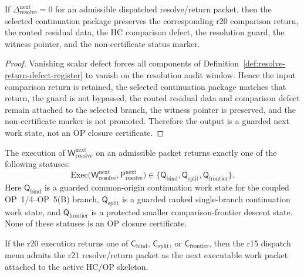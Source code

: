 \begin{lemma}
\label{lem:zero-resolve-return-defect-preserves-selected-continuation-data}
If \(\Delta_{\mathrm{resolve}}^{\mathrm{next}}=0\) for an admissible dispatched resolve/return packet, then the selected continuation package preserves the corresponding r20 comparison return, the routed residual data, the HC comparison defect, the resolution guard, the witness pointer, and the non-certificate status marker.
\end{lemma}

\begin{proof}
Vanishing scalar defect forces all components of Definition~\ref{def:resolve-return-defect-register} to vanish on the resolution audit window.  Hence the input comparison return is retained, the selected continuation package matches that return, the guard is not bypassed, the routed residual data and comparison defect remain attached to the selected branch, the witness pointer is preserved, and the non-certificate marker is not promoted.  Therefore the output is a guarded next work state, not an OP closure certificate.
\end{proof}

\begin{definition}
\label{def:r21-resolve-return-output}
The execution of \(\mathsf W_{\mathrm{resolve}}^{\mathrm{next}}\) on an admissible packet returns exactly one of the following statuses:
\[
\mathrm{Exec}\bigl(\mathsf W_{\mathrm{resolve}}^{\mathrm{next}},
                   \mathsf P_{\mathrm{resolve}}^{\mathrm{next}}\bigr)
\in
\{\mathsf Q_{\mathrm{bind}},\mathsf Q_{\mathrm{split}},\mathsf Q_{\mathrm{frontier}}\}.
\]
Here \(\mathsf Q_{\mathrm{bind}}\) is a guarded common-origin continuation work state for the coupled OP~1/4--OP~5(B) branch, \(\mathsf Q_{\mathrm{split}}\) is a guarded ranked single-branch continuation work state, and \(\mathsf Q_{\mathrm{frontier}}\) is a protected smaller comparison-frontier descent state.  None of these statuses is an OP closure certificate.
\end{definition}

\begin{proposition}
\label{prop:dispatched-resolve-return-packet-admissible}
If the r20 execution returns one of \(\mathsf C_{\mathrm{bind}}\), \(\mathsf C_{\mathrm{split}}\), or \(\mathsf C_{\mathrm{frontier}}\), then the r15 dispatch menu admits the r21 resolve/return packet as the next executable work packet attached to the active HC/OP skeleton.
\end{proposition}


